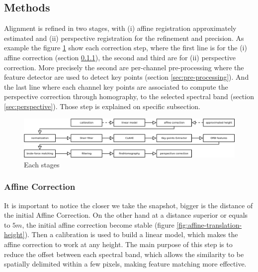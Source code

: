 \documentclass[]{elsarticle}
\begin{document}
	\subsection{Methods}
	
	Alignment is refined in two stages, with (i) affine registration approximately estimated
	and (ii) perspective registration for the refinement and precision.
	As example the figure \ref{fig:each-stages} show each correction step, where the first line is for the (i) affine correction (section \ref{sec:affine}), the second and third are for (ii) perspective correction.
	More precisely the second are per-channel pre-processing where the feature detector are used to detect key points (section \ref{sec:pre-processing}).
	And the last line where each channel key points are associated to compute the perspective correction through homography, to the selected spectral band (section \ref{sec:perspective}).
	Those step is explained on specific subsection.
	
	\begin{figure}[H]
		\centering
		\includegraphics[width=\linewidth]{../figures/step.png}
		\caption{Each stages}
		\label{fig:each-stages}
	\end{figure}

	
	\subsubsection{Affine Correction}
	\label{sec:affine}
	
	It is important to notice the closer we take the snapshot, bigger is the distance of the initial Affine Correction.
	On the other hand at a distance superior or equals to $5m$, the initial affine correction become stable (figure \ref{fig:affine-translation-height}).
	Then a calibration is used to build a linear model, which makes the affine correction to work at any height.
	The main purpose of this step is to reduce the offset between each spectral band,
	which allows the similarity to be spatially delimited within a few pixels, making feature matching more effective.
	
\end{document}

